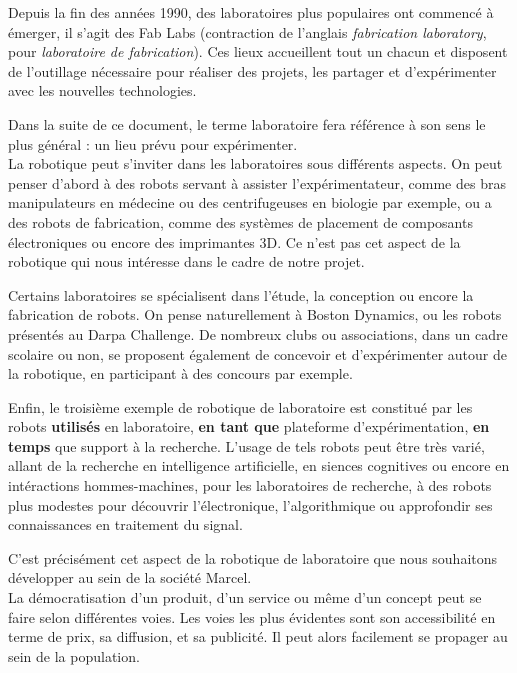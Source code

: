 \documentclass[a4paper,12pt]{report}
\begin{document}
Depuis la fin des années 1990, des laboratoires plus populaires ont commencé à émerger,
il s'agit des Fab Labs (contraction de l'anglais \emph{fabrication laboratory}, pour \emph{laboratoire de fabrication}).
Ces lieux accueillent tout un chacun et disposent de l'outillage nécessaire pour réaliser des projets, les partager et d'expérimenter avec les nouvelles technologies.

Dans la suite de ce document, le terme laboratoire fera référence à son sens le plus général : un lieu prévu pour expérimenter.\\

La robotique peut s'inviter dans les laboratoires sous différents aspects.
On peut penser d'abord à des robots servant à assister l'expérimentateur, comme des bras manipulateurs en médecine ou des centrifugeuses en biologie par exemple, 
ou a des robots de fabrication, comme des systèmes de placement de composants électroniques ou encore des imprimantes 3D.
Ce n'est pas cet aspect de la robotique qui nous intéresse dans le cadre de notre projet.

Certains laboratoires se spécialisent dans l'étude, la conception ou encore la fabrication de robots.
On pense naturellement à Boston Dynamics, ou les robots présentés au Darpa Challenge. 
De nombreux clubs ou associations, dans un cadre scolaire ou non, se proposent également de concevoir et d'expérimenter autour de la robotique, 
en participant à des concours par exemple.

Enfin, le troisième exemple de robotique de laboratoire est constitué par les robots \textbf{utilisés} en laboratoire, 
\textbf{en tant que} plateforme d'expérimentation, \textbf{en temps} que support à la recherche.
L'usage de tels robots peut être très varié, allant de la recherche en intelligence artificielle, 
en siences cognitives ou encore en intéractions hommes-machines, pour les laboratoires de recherche, 
à des robots plus modestes pour découvrir l'électronique, l'algorithmique ou approfondir ses connaissances en traitement du signal.

C'est précisément cet aspect de la robotique de laboratoire que nous souhaitons développer au sein de la société Marcel.\\

La démocratisation d'un produit, d'un service ou même d'un concept peut se faire selon différentes voies. 
Les voies les plus évidentes sont son accessibilité en terme de prix, sa diffusion, et sa publicité.
Il peut alors facilement se propager au sein de la population.
\end{document}
